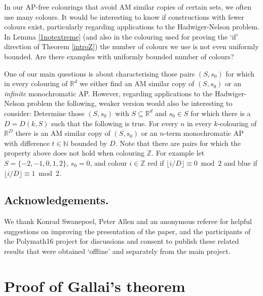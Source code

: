 \documentclass[12pt]{article}
\newcommand{\Z}{{\mathbb Z}}
\theoremstyle{plain}
\theoremstyle{definition}
\begin{document}
\bigskip



In our AP-free colourings that avoid AM similar copies of certain sets, we often use many colours. 
It would be interesting to know if constructions with fewer colours exist, particularly regarding applications to the Hadwiger-Nelson problem.
In Lemma \ref{1notextreme} (and also in the colouring used for proving the `if' direction of Theorem \ref{introZ}) the number of colours we use is not even uniformly bounded. Are there examples with uniformly bounded number of colours?

\bigskip

One of our main questions is about characterising those pairs $(S,s_0)$ for which in every colouring of $\mathbb{R}^d$ we either find an AM similar copy of $(S,s_0)$ or an \emph{infinite} monochromatic AP. However, regarding applications to the Hadwiger-Nelson problem the following, weaker version would also be interesting to consider: Determine those $(S,s_0)$ with $S\subseteq \mathbb{R}^d$ and $s_0\in S$ for which there is a $D=D(k,S)$ such that the following is true. For every $n$ in every $k$-colouring of $\mathbb{R}^D$ there is an AM similar copy of $(S,s_0)$ or an $n$-term monochromatic AP with difference $t\in \mathbb{N}$ bounded by $D$. 
Note that there are pairs for which the property above does not hold when colouring $\mathbb{Z}$. For example let $S=\{-2,-1,0,1,2\}$, $s_0=0$, and colour $i\in \Z$ red if $\lfloor i/D\rfloor \equiv 0 \bmod 2$ and blue if $\lfloor i/D\rfloor \equiv 1 \bmod 2$.




\subsection*{Acknowledgements.} We thank Konrad Swanepoel, Peter Allen and an anonymous referee for helpful suggestions on improving the presentation of the paper, and the participants of the Polymath16 project for discussions and consent to publish these related results that were obtained `offline' and separately from the main project.









\appendix




\section{Proof of Gallai's theorem}\label{sec:gallai}
\end{document}
